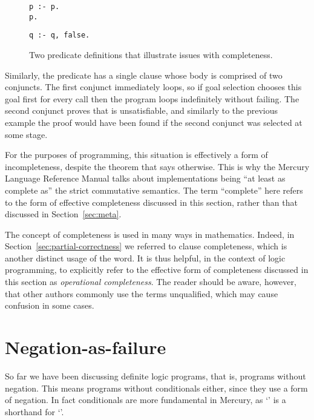 \begin{figure}
\begin{center}
\begin{minipage}[t]{9em}
\begin{verbatim}
p :- p.
p.
\end{verbatim}
\end{minipage}
\begin{minipage}[t]{9em}
\begin{verbatim}
q :- q, false.
\end{verbatim}
\end{minipage}
\end{center}
\caption{
Two predicate definitions that illustrate issues with completeness.
\label{fig:incompleteness}
}
\end{figure}

Similarly,
the predicate  has a single clause
whose body is comprised of two conjuncts.
The first conjunct immediately loops,
so if goal selection chooses this goal first for every call
then the program loops indefinitely without failing.
The second conjunct proves that  is unsatisfiable,
and similarly to the previous example the proof would have been found
if the second conjunct was selected at some stage.

For the purposes of programming,
this situation is effectively a form of incompleteness,
despite the theorem that says otherwise.
This is why the Mercury Language Reference Manual
talks about implementations being
``at least as complete as'' the strict commutative semantics.
The term ``complete'' here refers to
the form of effective completeness discussed in this section,
rather than that discussed in Section~\ref{sec:meta}.

The concept of completeness is used in many ways in mathematics.
Indeed,
in Section~\ref{sec:partial-correctness}
we referred to clause completeness,
which is another distinct usage of the word.
It is thus helpful, in the context of logic programming,
to explicitly refer to the effective form of completeness
discussed in this section as \emph{operational completeness}.
The reader should be aware, however,
that other authors commonly use the terms unqualified,
which may cause confusion in some cases.


\section{Negation-as-failure}
\label{sec:naf}

So far we have been discussing definite logic programs,
that is, programs without negation.
This means programs without conditionals either,
since they use a form of negation.
In fact conditionals are more fundamental in Mercury,
as `' is a shorthand for
`'.

